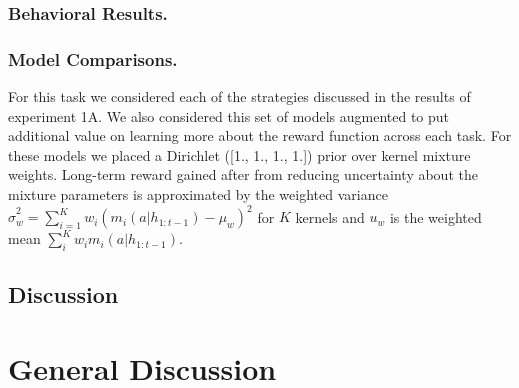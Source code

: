 \documentclass[10pt,letterpaper]{article}
\begin{document}
	\subsubsection{Behavioral Results.}
	
	\subsubsection{Model Comparisons.}
	
	For this task we considered each of the strategies discussed in the results of experiment 1A. We also considered this set of models augmented to put additional value on learning more about the reward function across each task. For these models we placed a Dirichlet ([1., 1., 1., 1.]) prior over kernel mixture weights. Long-term reward gained after from reducing uncertainty about the mixture parameters is approximated by the weighted variance $\hat{\sigma}^{2}_{w} = \sum_{i = 1}^{K} w_{i}(m_{i}(a|h_{1:t-1}) - \mu_{w})^{2}$ for $K$ kernels and $u_{w}$ is the weighted mean $\sum_{i}^{K} w_{i} m_{i}(a|h_{1:t-1})$.

	
	\subsection{Discussion}
	
	\section{General Discussion}
	
	
	
	\setlength{\bibleftmargin}{.125in}
	\setlength{\bibindent}{-\bibleftmargin}
	
	
		
	
\end{document}
